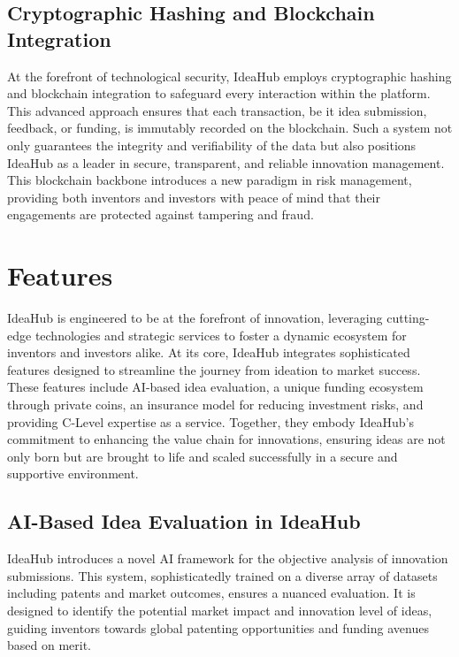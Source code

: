 \documentclass{article}
\begin{document}
	\subsection{Cryptographic Hashing and Blockchain Integration}
	At the forefront of technological security, IdeaHub employs cryptographic hashing and blockchain integration to safeguard every interaction within the platform. This advanced approach ensures that each transaction, be it idea submission, feedback, or funding, is immutably recorded on the blockchain. Such a system not only guarantees the integrity and verifiability of the data but also positions IdeaHub as a leader in secure, transparent, and reliable innovation management. This blockchain backbone introduces a new paradigm in risk management, providing both inventors and investors with peace of mind that their engagements are protected against tampering and fraud.
	
	\section{Features}
	IdeaHub is engineered to be at the forefront of innovation, leveraging cutting-edge technologies and strategic services to foster a dynamic ecosystem for inventors and investors alike. At its core, IdeaHub integrates sophisticated features designed to streamline the journey from ideation to market success. These features include AI-based idea evaluation, a unique funding ecosystem through private coins, an insurance model for reducing investment risks, and providing C-Level expertise as a service. Together, they embody IdeaHub's commitment to enhancing the value chain for innovations, ensuring ideas are not only born but are brought to life and scaled successfully in a secure and supportive environment.
	
	\subsection{AI-Based Idea Evaluation in IdeaHub}
	IdeaHub introduces a novel AI framework for the objective analysis of innovation submissions. This system, sophisticatedly trained on a diverse array of datasets including patents and market outcomes, ensures a nuanced evaluation. It is designed to identify the potential market impact and innovation level of ideas, guiding inventors towards global patenting opportunities and funding avenues based on merit.
	
\end{document}
